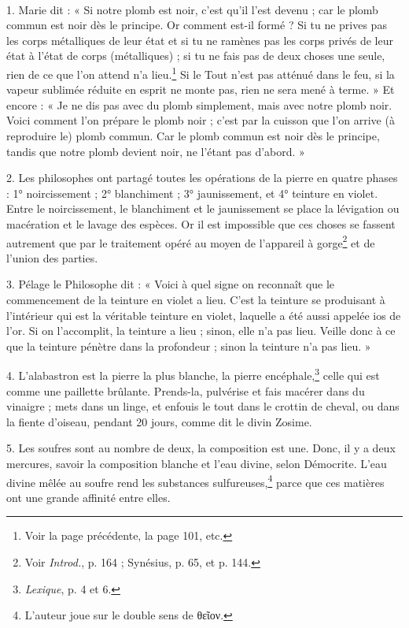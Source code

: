 \documentclass[landscape, a4paper, 11pt, oneside, polutonikogreek, french]{article}
\begin{document}
\paragraph{}
1. Marie dit : « Si notre plomb est noir, c'est qu'il l'est devenu ; car le plomb commun est noir dès le principe. Or comment est-il formé ? Si tu ne prives pas les corps métalliques de leur état et si tu ne ramènes pas les corps privés de leur état à l'état de corps (métalliques) ; si tu ne fais pas de deux choses une seule, rien de ce que l'on attend n'a lieu.\footnote{Voir la page précédente, la page 101, etc.} Si le Tout n'est pas atténué dans le feu, si la vapeur sublimée réduite en esprit ne monte pas, rien ne sera mené à terme. » Et encore : « Je ne dis pas avec du plomb simplement, mais avec notre plomb noir. Voici comment l'on prépare le plomb noir ; c'est par la cuisson que l'on arrive (à reproduire le) plomb commun. Car le plomb commun est noir dès le principe, tandis que notre plomb devient noir, ne l'étant pas d'abord. »

2. Les philosophes ont partagé toutes les opérations de la pierre en quatre phases : 1° noircissement ; 2° blanchiment ; 3° jaunissement, et 4° teinture en violet. Entre le noircissement, le blanchiment et le jaunissement se place la lévigation ou macération et le lavage des espèces. Or il est impossible que ces choses se fassent autrement que par le traitement opéré au moyen de l'appareil à gorge\footnote{Voir \emph{Introd.}, p. 164 ; Synésius, p. 65, et p. 144.} et de l'union des parties.

3. Pélage le Philosophe dit : « Voici à quel signe on reconnaît que le commencement de la teinture en violet a lieu. C'est la teinture se produisant à l'intérieur qui est la véritable teinture en violet, laquelle a été aussi appelée ios de l'or. Si on l'accomplit, la teinture a lieu ; sinon, elle n'a pas lieu. Veille donc à ce que la teinture pénètre dans la profondeur ; sinon la teinture n'a pas lieu. »

4. L'alabastron est la pierre la plus blanche, la pierre encéphale,\footnote{\emph{Lexique}, p. 4 et 6.} celle qui est comme une paillette brûlante. Prends-la, pulvérise et fais macérer dans du vinaigre ; mets dans un linge, et enfouis le tout dans le crottin de cheval, ou dans la fiente d'oiseau, pendant 20 jours, comme dit le divin Zosime.

5. Les soufres sont au nombre de deux, la composition est une. Donc, il y a deux mercures, savoir la composition blanche et l'eau divine, selon Démocrite. L'eau divine mêlée au soufre rend les substances sulfureuses,\footnote{L'auteur joue sur le double sens de θεῖον.} parce que ces matières ont une grande affinité entre elles.
\end{document}

